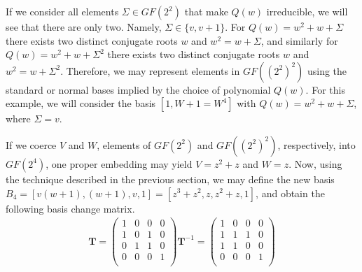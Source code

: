 If we consider all elements $\Sigma \in GF(2^2)$ that make $Q(w)$ irreducible, we will see that there are only two. Namely, $\Sigma \in \{v, v+1\}$. For $Q(w) = w^2 + w + \Sigma$ there exists two distinct conjugate roots $w$ and $w^2 = w + \Sigma$, and similarly for $Q(w) = w^2 + w + \Sigma^2$ there exists two distinct conjugate roots $w$ and $w^2 = w + \Sigma^2$. Therefore, we may represent elements in $GF((2^2)^2)$ using the standard or normal bases implied by the choice of polynomial $Q(w)$. For this example, we will consider the basis $[1,W + 1 = W^4]$ with $Q(w) = w^2 + w + \Sigma$, where $\Sigma = v$.

If we coerce $V$ and $W$, elements of $GF(2^2)$ and $GF((2^2)^2)$, respectively, into $GF(2^4)$, one proper embedding may yield $V = z^2 + z$ and $W = z$. Now, using the technique described in the previous section, we may define the new basis $B_4 = [v(w+1),(w+1),v, 1] = [z^3 + z^2, z, z^2 + z, 1]$, and obtain the following basis change matrix. 
\begin{align*}
\mathbf{T} = 
\begin{pmatrix}
1 & 0 & 0 & 0 \\
1 & 0 & 1 & 0 \\
0 & 1 & 1 & 0 \\
0 & 0 & 0 & 1 \\
\end{pmatrix} 
\mathbf{T}^{-1} = 
\begin{pmatrix}
1 & 0 & 0 & 0 \\
1 & 1 & 1 & 0 \\
1 & 1 & 0 & 0 \\
0 & 0 & 0 & 1 \\
\end{pmatrix}
\end{align*}

